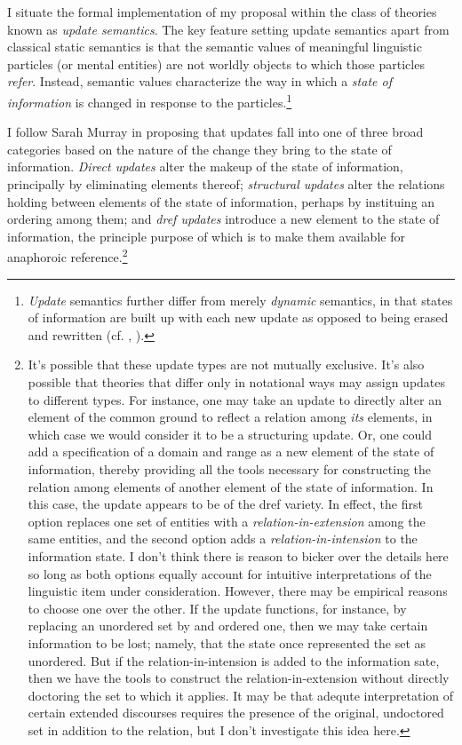 \documentclass[letterpaper,]{article}
\begin{document}
I situate the formal implementation of my proposal within the class of
theories known as \emph{update semantics}. The key feature setting
update semantics apart from classical static semantics is that the
semantic values of meaningful linguistic particles (or mental entities)
are not worldly objects to which those particles \emph{refer}. Instead,
semantic values characterize the way in which a \emph{state of
information} is changed in response to the particles.\footnote{\emph{Update}
  semantics further differ from merely \emph{dynamic} semantics, in that
  states of information are built up with each new update as opposed to
  being erased and rewritten (cf.
  \autocite{dekker-pla}, \autocite{groenendijk1991}).}

I follow Sarah Murray \autocite*{murray2014} in proposing that updates
fall into one of three broad categories based on the nature of the
change they bring to the state of information. \emph{Direct updates}
alter the makeup of the state of information, principally by eliminating
elements thereof; \emph{structural updates} alter the relations holding
between elements of the state of information, perhaps by instituing an
ordering among them; and \emph{dref updates} introduce a new element to
the state of information, the principle purpose of which is to make them
available for anaphoroic reference.\footnote{It's possible that these
  update types are not mutually exclusive. It's also possible that
  theories that differ only in notational ways may assign updates to
  different types. For instance, one may take an update to directly
  alter an element of the common ground to reflect a relation among
  \emph{its} elements, in which case we would consider it to be a
  structuring update. Or, one could add a specification of a domain and
  range as a new element of the state of information, thereby providing
  all the tools necessary for constructing the relation among elements
  of another element of the state of information. In this case, the
  update appears to be of the dref variety. In effect, the first option
  replaces one set of entities with a \emph{relation-in-extension} among
  the same entities, and the second option adds a
  \emph{relation-in-intension} to the information state. I don't think
  there is reason to bicker over the details here so long as both
  options equally account for intuitive interpretations of the
  linguistic item under consideration. However, there may be empirical
  reasons to choose one over the other. If the update functions, for
  instance, by replacing an unordered set by and ordered one, then we
  may take certain information to be lost; namely, that the state once
  represented the set as unordered. But if the relation-in-intension is
  added to the information sate, then we have the tools to construct the
  relation-in-extension without directly doctoring the set to which it
  applies. It may be that adequte interpretation of certain extended
  discourses requires the presence of the original, undoctored set in
  addition to the relation, but I don't investigate this idea here.}
\end{document}
